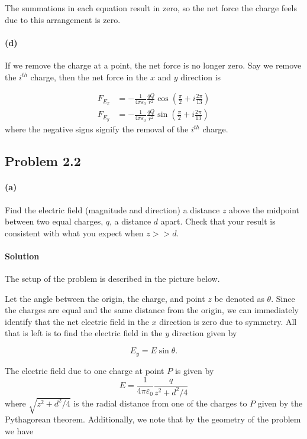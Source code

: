 \documentclass{article}
\begin{document}
The summations in each equation result in zero, so the net force the charge feels due to this arrangement is zero. 

\paragraph{(d)} If we remove the charge at a point, the net force is no longer zero.  Say we remove the $i^{th}$ charge, then the net force in the $x$ and $y$ direction is 

\begin{align*}
    F_{E_x} &= -\frac{1}{4\pi\varepsilon_0}\frac{qQ}{r^2}\cos(\frac{\pi}{2} + i\frac{2\pi}{13}) \\
F_{E_y} &= -\frac{1}{4\pi\varepsilon_0}\frac{qQ}{r^2}\sin(\frac{\pi}{2} + i\frac{2\pi}{13}) 
\end{align*}
where the negative signs signify the removal of the $i^{th}$ charge.

\newpage

\subsection*{Problem 2.2}
\paragraph{(a)} Find the electric field (magnitude and direction) a distance $z$ above the midpoint between two equal charges, $q$, a distance $d$ apart. Check that your result is consistent with what you expect when $z >> d$.

\paragraph{Solution} The setup of the problem is described in the picture below. 



Let the angle between the origin, the charge, and point $z$ be denoted as $\theta$. Since the charges are equal and the same distance from the origin, we can immediately identify that the net electric field in the $x$ direction is zero due to symmetry. All that is left is to find the electric field in the $y$ direction given by

$$
E_{y} = E\sin\theta.
$$

The electric field due to one charge at point $P$ is given by 
$$
E = \frac{1}{4\pi\varepsilon_0}\frac{q}{z^2 + d^2/4}
$$
where $\sqrt{z^2 + d^2/4}$ is the radial distance from one of the charges to $P$ given by the Pythagorean theorem.  Additionally, we note that by the geometry of the problem we have 
\end{document}
